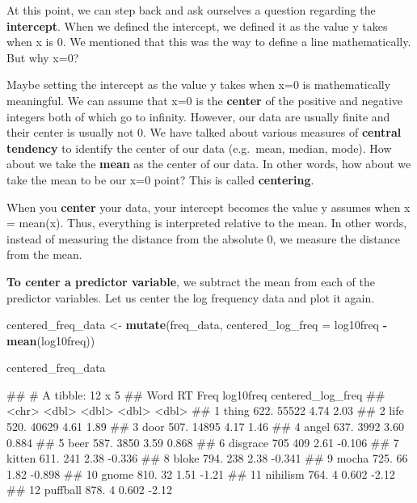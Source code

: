 \documentclass[
]{book}
\newenvironment{Shaded}{\begin{snugshade}}{\end{snugshade}}
\newcommand{\AttributeTok}[1]{\textcolor[rgb]{0.13,0.29,0.53}{#1}}
\newcommand{\FunctionTok}[1]{\textcolor[rgb]{0.13,0.29,0.53}{\textbf{#1}}}
\newcommand{\NormalTok}[1]{#1}
\newcommand{\OtherTok}[1]{\textcolor[rgb]{0.56,0.35,0.01}{#1}}
\newcommand{\SpecialCharTok}[1]{\textcolor[rgb]{0.81,0.36,0.00}{\textbf{#1}}}
\begin{document}
At this point, we can step back and ask ourselves a question regarding the \textbf{intercept}. When we defined the intercept, we defined it as the value y takes when x is 0. We mentioned that this was the way to define a line mathematically. But why x=0?

Maybe setting the intercept as the value y takes when x=0 is mathematically meaningful. We can assume that x=0 is the \textbf{center} of the positive and negative integers both of which go to infinity. However, our data are usually finite and their center is usually not 0. We have talked about various measures of \textbf{central tendency} to identify the center of our data (e.g.~mean, median, mode). How about we take the \textbf{mean} as the center of our data. In other words, how about we take the mean to be our x=0 point? This is called \textbf{centering}.

When you \textbf{center} your data, your intercept becomes the value y assumes when x = mean(x). Thus, everything is interpreted relative to the mean. In other words, instead of measuring the distance from the absolute 0, we measure the distance from the mean.

\textbf{To center a predictor variable}, we subtract the mean from each of the predictor variables. Let us center the log frequency data and plot it again.

\begin{Shaded}
\begin{Highlighting}[]
\NormalTok{centered\_freq\_data }\OtherTok{\textless{}{-}} \FunctionTok{mutate}\NormalTok{(freq\_data, }\AttributeTok{centered\_log\_freq =}\NormalTok{ log10freq }\SpecialCharTok{{-}} \FunctionTok{mean}\NormalTok{(log10freq))}

\NormalTok{centered\_freq\_data}
\end{Highlighting}
\end{Shaded}

\begin{Shaded}
\begin{Highlighting}[]
\NormalTok{\#\# \# A tibble: 12 x 5}
\NormalTok{\#\#    Word        RT  Freq log10freq centered\_log\_freq}
\NormalTok{\#\#    \textless{}chr\textgreater{}    \textless{}dbl\textgreater{} \textless{}dbl\textgreater{}     \textless{}dbl\textgreater{}             \textless{}dbl\textgreater{}}
\NormalTok{\#\#  1 thing     622. 55522     4.74              2.03 }
\NormalTok{\#\#  2 life      520. 40629     4.61              1.89 }
\NormalTok{\#\#  3 door      507. 14895     4.17              1.46 }
\NormalTok{\#\#  4 angel     637.  3992     3.60              0.884}
\NormalTok{\#\#  5 beer      587.  3850     3.59              0.868}
\NormalTok{\#\#  6 disgrace  705    409     2.61             {-}0.106}
\NormalTok{\#\#  7 kitten    611.   241     2.38             {-}0.336}
\NormalTok{\#\#  8 bloke     794.   238     2.38             {-}0.341}
\NormalTok{\#\#  9 mocha     725.    66     1.82             {-}0.898}
\NormalTok{\#\# 10 gnome     810.    32     1.51             {-}1.21 }
\NormalTok{\#\# 11 nihilism  764.     4     0.602            {-}2.12 }
\NormalTok{\#\# 12 puffball  878.     4     0.602            {-}2.12}
\end{Highlighting}
\end{Shaded}
\end{document}
